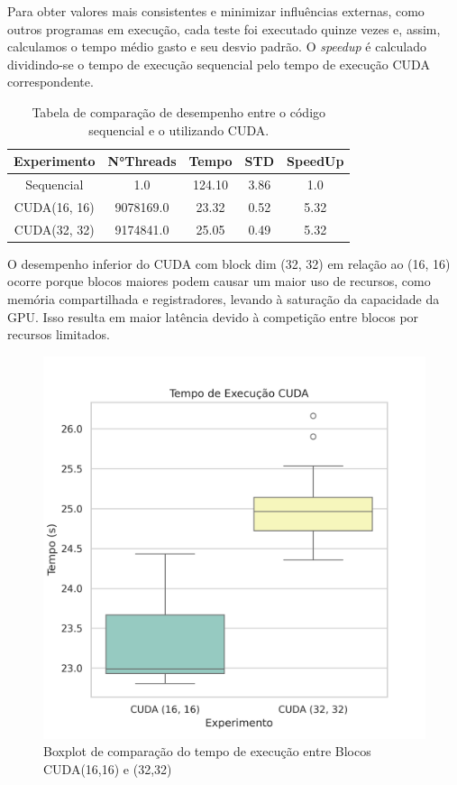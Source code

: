 \documentclass[12pt]{article}
\begin{document}
Para obter valores mais consistentes e minimizar influências externas, como
outros programas em execução, cada teste foi executado quinze vezes e, assim,
calculamos o tempo médio gasto e seu desvio padrão. O \textit{speedup} é
calculado dividindo-se o tempo de execução sequencial pelo tempo de execução
CUDA correspondente.

\begin{table}[ht]
  \centering
  \caption{Tabela de comparação de desempenho entre o código sequencial e o
    utilizando CUDA.}
  \vspace{0.3cm}
  \begin{tabular}{||c c c c c||}
    \hline
    Experimento &  N°Threads          & Tempo & STD & SpeedUp \\ [0.5ex]
    \hline\hline
    Sequencial         & 1.0 & 124.10    & 3.86 & 1.0     \\
    \hline
    CUDA(16, 16)          & 9078169.0  & 23.32  & 0.52  & 5.32   \\
    \hline
    CUDA(32, 32)          & 9174841.0  & 25.05   & 0.49 & 5.32  \\
    \hline
  \end{tabular}
\end{table}

O desempenho inferior do CUDA com block dim (32, 32) em relação ao (16, 16) ocorre porque blocos maiores podem causar um maior uso de recursos, como memória compartilhada e registradores, levando à saturação da capacidade da GPU. Isso resulta em maior latência devido à competição entre blocos por recursos limitados.

\begin{figure}[H]
  \centering
  \includegraphics[width=.40\textwidth]{figs/times_boxplot_cuda.png}
  \caption{Boxplot de comparação do tempo de execução entre Blocos CUDA(16,16) e (32,32)}
  \label{fig:boxplot_cuda}
\end{figure}
\end{document}
